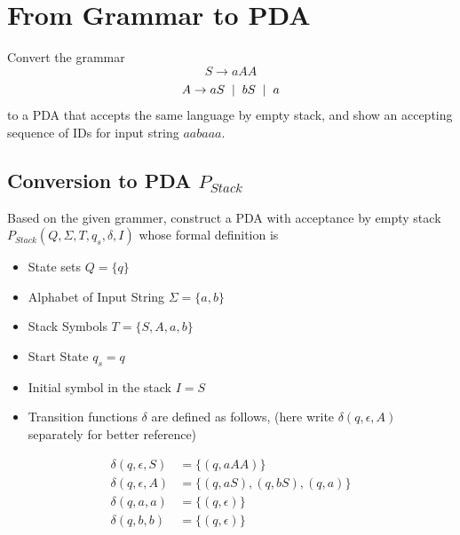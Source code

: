 \documentclass[11pt,a4paper]{article}
\newcommand{\htab}{\hspace*{0.63cm}}
\newcommand{\ba}{\hspace*{0.2cm} | \hspace*{0.2cm}}
\newcommand{\ps}{P_{Stack}}
\begin{document}
\section{From Grammar to PDA}
\htab Convert the grammar
    $$ S \rightarrow aAA $$
    $$ A \rightarrow aS \ba bS \ba a $$
\htab to a PDA that accepts the same language by empty stack, and show an accepting sequence of IDs for input string $aabaaa$.
\subsection{Conversion to PDA $\ps$}
\htab Based on the given grammer, construct a PDA with acceptance by empty stack 
$\ps (Q, \Sigma, T, q_{s}, \delta, I)$ whose formal definition is 
\begin{itemize} 
    \item State sets $Q = \{q\}$  
    \item Alphabet of Input String $\Sigma = \{a, b\}$  
    \item Stack Symbols $T = \{S, A, a, b\}$  
    \item Start State $q_{s} = q$  
    \item Initial symbol in the stack $I = S$  
    \item Transition functions $\delta$ are defined as follows, (here write $\delta (q, \epsilon, A)$ separately for better reference)
\end{itemize}
    \begin{align}
        \delta (q, \epsilon, S) &= \{(q, aAA)\} \label{ps1} \\
        \delta (q, \epsilon, A) &= \{(q, aS), (q, bS), (q, a)\} \label{ps2}\\
        \delta (q, a, a) &= \{(q, \epsilon)\} \label{ps5}\\
        \delta (q, b, b) &= \{(q, \epsilon)\} \label{ps6} 
    \end{align}
\end{document}
